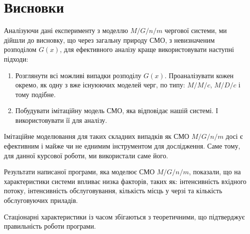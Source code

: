 \documentclass[14pt]{extarticle}
\begin{document}
\newpage

\section{Висновки}

Аналізуючи дані експерименту з моделлю \(M/G/n/m\) чергової системи, ми дійшли
до висновку, що через загальну природу СМО, з невизначеним розподілом \(G(x)\), для ефективного аналізу краще використовувати наступні підходи:

\begin{enumerate}
  \item Розглянути всі можливі випадки розподілу \(G(x)\). Проаналізувати кожен
        окремо, як одну з вже існуюючих моделей черг, по типу: \(M/M/c\),
        \(M/D/c\) і тому подібне.
  \item Побудувати імітаційну модель СМО, яка відповідає нашій системі. І
        використовувати її для аналізу.
\end{enumerate}

Імітаційне моделювання для таких складних випадків як СМО \(M/G/n/m\) досі є
ефективним і майже чи не еднимим інструментом для дослідження. Саме тому, для
данної курсової роботи, ми використали саме його.

Результати написаної програми, яка моделює СМО \(M/G/n/m\), показали, що на
характеристики системи впливає низка факторів, таких як: інтенсивність вхідного
потоку, інтенсивність обслуговування, кількість місць у черзі та кількість
обслуговуючих приладів.

Стаціонарні характеристики із часом збігаються з теоретичними, що підтверджує
правильність роботи програми.

\newpage

\printbibliography
\end{document}
